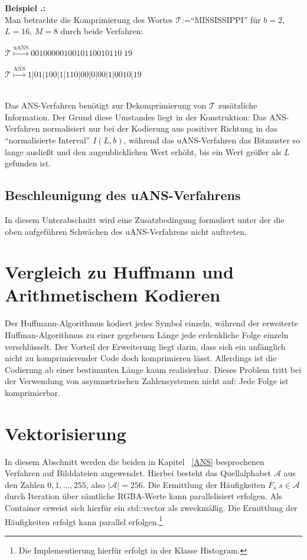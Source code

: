\documentclass[a4paper,12pt]{article}
\newcommand{\A}{\mathcal A}
\newcounter{Beispiel}
\newcounter{Algorithmus}
\newenvironment{Beispiel}{
\medskip
        
        \setlength{\parindent}{0pt}
        \addtocounter{Beispiel}{1}
        \textbf{\textsf{Beispiel \thesubsection.\theBeispiel}:}\\}{
        \nopagebreak
        \vspace{-1.0ex}
        \bigskip
        
}
\begin{document}
\begin{Beispiel}
Man betrachte die Komprimierung des Wortes $\mathcal{T}$:="`MISSISSIPPI"'  für $b=2$, $L=16$, $M=8$ durch beide Verfahren:
\par
\vspace{0.5cm}
\begin{minipage}[h]{.5\textwidth}
$\mathcal{T}\stackrel{\text{uANS}}{\mapsto} 0010000010010110010110\;19$
\end{minipage}
\hfill
 \begin{minipage}[h]{.5\textwidth}
$\mathcal{T}\stackrel{\text{ANS}}{\mapsto} 1|01|100|1|110|00|0|00|1|0010|19$
\end{minipage}   
\vspace{0.5cm}
\\
Das ANS-Verfahren benötigt zur Dekomprimierung von $\mathcal{T}$ zusätzliche Information. Der Grund diese Umstandes liegt in der Konstruktion: Das ANS-Verfahren normalisiert nur bei der Kodierung aus positiver Richtung in das "`normalisierte Interval"' $I(L,b)$, während das uANS-Verfahren das Bitmuster so lange ausließt und den augenblicklichen Wert erhöht, bis ein Wert größer als $L$ gefunden ist.

\end{Beispiel}
\subsection{Beschleunigung des uANS-Verfahrens}
In diesem Unterabschnitt wird eine Zusatzbedingung formuliert unter der die oben aufgeführen Schwächen des uANS-Verfahrens nicht auftreten.

\section{Vergleich zu Huffmann und Arithmetischem Kodieren}
Der Huffmann-Algorithmus kodiert jedes Symbol einzeln, während der erweiterte Huffman-Algorithmus zu einer gegebenen Länge jede erdenkliche Folge einzeln verschlüsselt. Der Vorteil der Erweiterung liegt darin, dass sich ein anfänglich nicht zu komprimierender Code doch komprimieren lässt. Allerdings ist die Codierung ab einer bestimmten Länge kaum realisierbar. Dieses Problem tritt bei der Verwendung von asymmetrischen Zahlensystemen nicht auf: Jede Folge ist komprimierbar.

\newpage
\section{Vektorisierung}
In diesem Abschnitt werden die beiden in Kapitel ~\ref{ANS} besprochenen Verfahren auf Bilddateien angewendet. 
Hierbei besteht das Quellalphabet $\A$ aus den Zahlen $0,1,\ldots,255$, also $\left|\A\right| = 256$. Die Ermittlung der Häufigkeiten $F_{s}\;s\in\A$ durch Iteration über sämtliche RGBA-Werte kann parallelisiert erfolgen. Als Container erweist sich hierfür ein std::vector als zweckmäßig. Die Ermittlung der Häufigkeiten erfolgt kann parallel erfolgen.\footnote{Die Implementierung hierfür erfolgt in der Klasse Histogram.}
\end{document}

